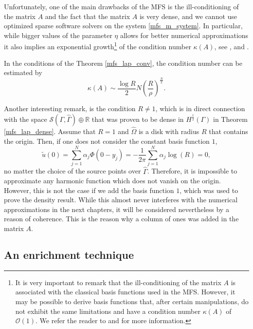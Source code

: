 Unfortunately, one of the main drawbacks of the MFS is the ill-conditioning of the matrix \(A\) and the fact that the matrix \(A\) is very dense, and we cannot use optimized sparse software solvers on the system \eqref{mfs_m_system}. In particular, while bigger values of the parameter \(\eta\) allows for better numerical approximations it also implies an exponential growth\footnote{It is very important to remark that the ill-conditioning of the matrix \(A\) is associated with the classical basis functions used in the MFS. However, it may be possible to derive basis functions that, after certain manipulations, do not exhibit the same limitations and have a condition number \(\kappa(A)\) of \(\mathcal{O}(1)\). We refer the reader to \cite{antunes2018reducing} and \cite{antunes2018numerical} for more information.} of the condition number \(\kappa(A)\), see \cite{christiansen1981condition}, \cite{kitagawa1988numerical} and \cite{kitagawa1991asymptotic}.
\begin{theorem}
    In the conditions of the Theorem \eqref{mfs_lap_conv}, the condition number can be estimated by
    \[
        \kappa(A) \sim \frac{\log R}{2}N \left(\frac{R}{\rho}\right)^{\frac{N}{2}}.
    \]
\end{theorem}
Another interesting remark, is the condition \(R \neq 1\), which is in direct connection with the space \(\mathcal{S}(\Gamma, \hat{\Gamma}) \oplus \mathbb{R}\) that was proven to be dense in \(H^\frac{1}{2}(\Gamma)\) in Theorem \eqref{mfs_lap_dense}. Assume that \(R=1\) and \(\hat{\Omega}\) is a disk with radius \(R\) that contains the origin. Then, if one does not consider the constant basis function \(1\),
\[
    \tilde{u}(0) = \sum_{j=1}^{N}\alpha_j \Phi(0-y_j) = -\frac{1}{2\pi}\sum_{j=1}^{N}\alpha_j \log(R) = 0,
\]
no matter the choice of the source points over \(\hat{\Gamma}\). Therefore, it is impossible to approximate any harmonic function which does not vanish on the origin. However, this is not the case if we add the basis function \(1\), which was used to prove the density result. While this almost never interferes with the numerical approximations in the next chapters, it will be considered nevertheless by a reason of coherence. This is the reason why a column of ones was added in the matrix \(A\).

\subsection{An enrichment technique}\label{m_particular_solutions}


